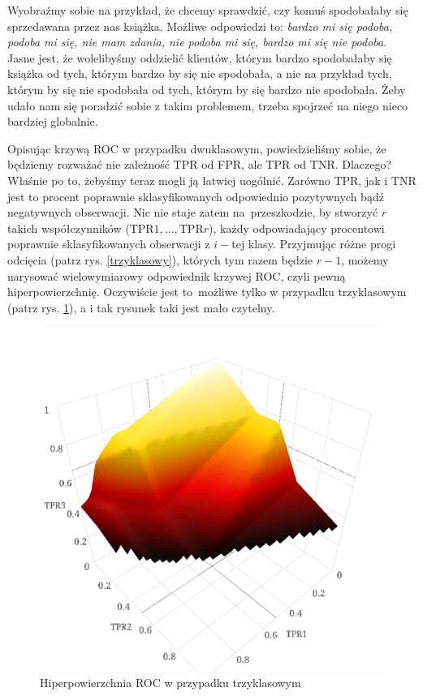 \documentclass{mini}
\begin{document}
Wyobraźmy sobie na przykład, że chcemy sprawdzić, czy komuś spodobałaby się sprzedawana przez nas książka. Możliwe odpowiedzi to: \textit{bardzo mi się podoba, podoba mi się, nie mam zdania, nie podoba mi się, bardzo mi się nie podoba}. Jasne jest, że wolelibyśmy oddzielić klientów, którym bardzo spodobałaby się książka od tych, którym bardzo by się nie spodobała, a nie na przykład tych, którym by się nie spodobała od tych, którym by się bardzo nie spodobała. Żeby udało nam się poradzić sobie z takim problemem, trzeba spojrzeć na niego nieco bardziej globalnie.   

Opisując krzywą ROC w przypadku dwuklasowym, powiedzieliśmy sobie, że będziemy rozważać nie zależność TPR od FPR, ale TPR od TNR. Dlaczego? Właśnie po to, żebyśmy teraz mogli ją łatwiej uogólnić. Zarówno TPR, jak i TNR jest to procent poprawnie sklasyfikowanych odpowiednio pozytywnych bądź negatywnych obserwacji. Nic nie staje zatem na~przeszkodzie, by stworzyć $r$ takich współczynników ($\text{TPR}1, \ldots, \text{TPR}r$), każdy odpowiadający procentowi poprawnie sklasyfikowanych obserwacji z $i-$tej klasy. Przyjmując różne progi odcięcia (patrz rys. \ref{trzyklasowy}), których tym razem będzie $r-1$, możemy narysować wielowymiarowy odpowiednik krzywej ROC, czyli pewną hiperpowierzchnię. Oczywiście jest to~możliwe tylko w przypadku trzyklasowym (patrz rys. \ref{3d}), a i tak rysunek taki jest mało czytelny. 

\begin{figure}[h]
\begin{center}
\includegraphics[scale=0.5]{graphics/roc3d.png}
\end{center}
\caption{Hiperpowierzchnia ROC w przypadku trzyklasowym}
\label{3d}
\end{figure}
\end{document}
